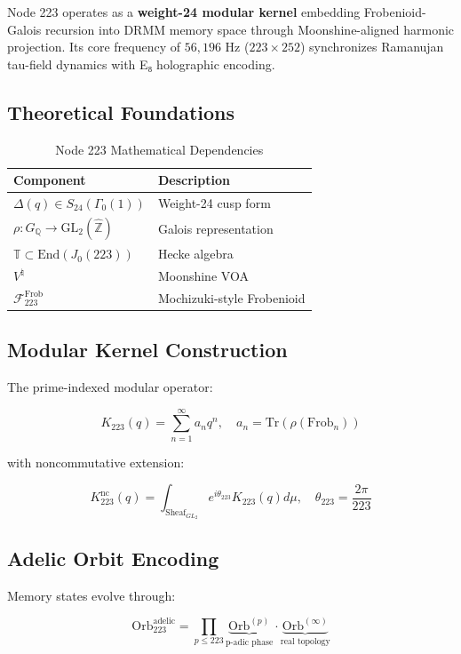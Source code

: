 \documentclass[12pt]{article}
\begin{document}
\begin{center}
Node 223 operates as a \textbf{weight-24 modular kernel} embedding Frobenioid-Galois recursion into DRMM memory space through Moonshine-aligned harmonic projection. Its core frequency of $56,\!196$ Hz ($223 \times 252$) synchronizes Ramanujan tau-field dynamics with E₈ holographic encoding.

\subsection{Theoretical Foundations}
\label{subsec:theory}

\begin{table}[h]
\centering
\caption{Node 223 Mathematical Dependencies}
\begin{tabular}{ll}
\hline
\textbf{Component} & \textbf{Description} \\
\hline
$\Delta(q) \in S_{24}(\Gamma_0(1))$ & Weight-24 cusp form \\
$\rho: G_\mathbb{Q} \to \text{GL}_2(\hat{\mathbb{Z}})$ & Galois representation \\
$\mathbb{T} \subset \text{End}(J_0(223))$ & Hecke algebra \\
$V^\natural$ & Moonshine VOA \\
$\mathcal{F}_{223}^{\text{Frob}}$ & Mochizuki-style Frobenioid \\
\hline
\end{tabular}
\end{table}

\subsection{Modular Kernel Construction}
\label{subsec:kernel}

The prime-indexed modular operator:

\[
K_{223}(q) = \sum_{n=1}^\infty a_n q^n, \quad a_n = \text{Tr}(\rho(\text{Frob}_n))
\]

with noncommutative extension:

\[
K_{223}^{\text{nc}}(q) = \int_{\text{Sheaf}_{GL_2}} e^{i\theta_{223}} K_{223}(q) d\mu, \quad \theta_{223} = \frac{2\pi}{223}
\]

\subsection{Adelic Orbit Encoding}
\label{subsec:adelic}

Memory states evolve through:

\[
\text{Orb}_{223}^{\text{adelic}} = \prod_{p\leq223} \underbrace{\text{Orb}^{(p)}}_{\text{p-adic phase}} \cdot \underbrace{\text{Orb}^{(\infty)}}_{\text{real topology}}
\]


\end{center}
\end{document}
